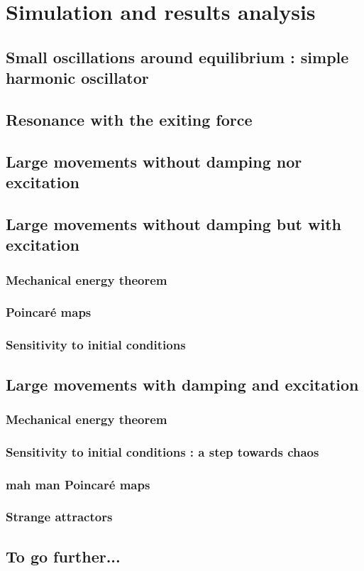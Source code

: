 \section{Simulation and results analysis}

\subsection{Small oscillations around equilibrium : simple harmonic oscillator}

\subsection{Resonance with the exiting force}

\subsection{Large movements without damping nor excitation}

\subsection{Large movements without damping but with excitation}
	
	\subsubsection{Mechanical energy theorem}
	
	\subsubsection{Poincaré maps}
	
	\subsubsection{Sensitivity to initial conditions}
	
\subsection{Large movements with damping and excitation}

	\subsubsection{Mechanical energy theorem}
	
	\subsubsection{Sensitivity to initial conditions : a step towards chaos}
	
	\subsubsection{mah man Poincaré maps}
	
	\subsubsection{Strange attractors}
	
\subsection{To go further...}